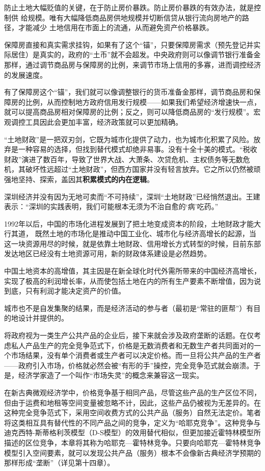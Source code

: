 防止土地大幅贬值的关键，在于防止房价暴跌。防止房价暴跌的有效办法，就是控制供
给规模。唯有大幅降低商品房供地规模并切断信贷从银行流向房地产的路径，才能减少
土地信用在市面上的流通，从而避免资产价格暴跌。

保障房直接和真实需求挂钩，如果有了这个“锚”，只要保障房需求（预先登记并实际居住）是真实的，政府的“土币”就不会超发。中央政府则可以像调节银行准备金那样，通过调节商品房与保障房的比例，来调节市场上信用的多寡，进而调控经济的发展速度。

有了保障房这个“锚”，我们就可以像调整银行的货币准备金那样，调节商品房和保障房的比例，从而控制地方政府信用发行规模——如果我们希望经济增速快一点，就可以提高商品房相对保障房的比例；反之，则可以降低商品房的“发行规模”。宏观调控工具因此会更加丰富，经济政策就可以更加精确。

“土地财政”是一把双刃剑，它既为城市化提供了动力，也为城市化积累了风险。放弃是一种容易的选择，但找到替代模式却绝非易事。没有十全十美的模式。“税收财政”演进了数百年，导致了世界大战、大萧条、次贷危机、主权债务等无数危机，其破坏性远超过“土地财政”，但西方国家并没有轻言放弃。它之所以仍然被顽强地坚持、探索，盖因其\textbf{积累模式的内在逻辑}。

深圳经济并没有因为无地可卖而“不可持续”，深圳“土地财政”已经悄然退出。王建表示：“深圳的实践表明，我们可能根本无须为不治自愈的‘病’吃药。”

1992年以后，中国的市场化进程发展到了把土地变成资本的阶段，土地财政才能大行其道，
既然土地的市场化是推动中国工业化、城市化与经济高增长的起源，当这一块资源用尽的时候，就是依靠土地财政、信用增长方式转型的时候，目前东部发达地区已经没有土地资源可用，新的财政体系建设是必然趋势。

中国土地资本的高增值，其主因是在新全球化时代外需所带来的中国经济高增长，实现了极高的利润增长率，从而使包括土地在内的所有生产要素不断增值，因为说到底，只有利润才能决定资产的价值。

城市也不是自发集聚的结果，而是经济活动的参与者（最初是“常驻的匪帮”）有目的地设计并提供的。

将政府视为一类生产公共产品的企业后，接下来就会涉及政府垄断的话题。在仅考虑私人产品生产的完全竞争范式下，价格是无数消费者和无数生产者共同面对的一个市场结果，没有单个消费者或生产者可以决定价格。而一旦将公共产品的生产者——政府引入市场，价格就必然会被“有形的手”操控，完全竞争范式就会崩溃。于是，经济学家造了一个叫作“市场失灵”的概念来兼容这一现实。

在新古典微观经济学中，价格竞争基于相同产品，尽管这些产品的生产区位不同，但由于运费和地租等空间变量被忽略不计，因此，这些产品仍被视为无差异的。在这种完全竞争范式下，采用空间收费方式的公共产品（服务）自然无法定价。笔者将这类相互具有替代性的不同产品之间的竞争，定义为“哈耶克竞争”。这种竞争与迪克西特-斯蒂格利茨模型（D-S模型）的效用替代相似，但更加接近霍特林模型所描述的区位竞争，本章将其称为哈耶克—霍特林竞争。只要向哈耶克—霍特林竞争模型引入空间要素，就可以发现公共产品（服务）根本不会像新古典经济学预期的那样形成“垄断”（详见第十四章）。

